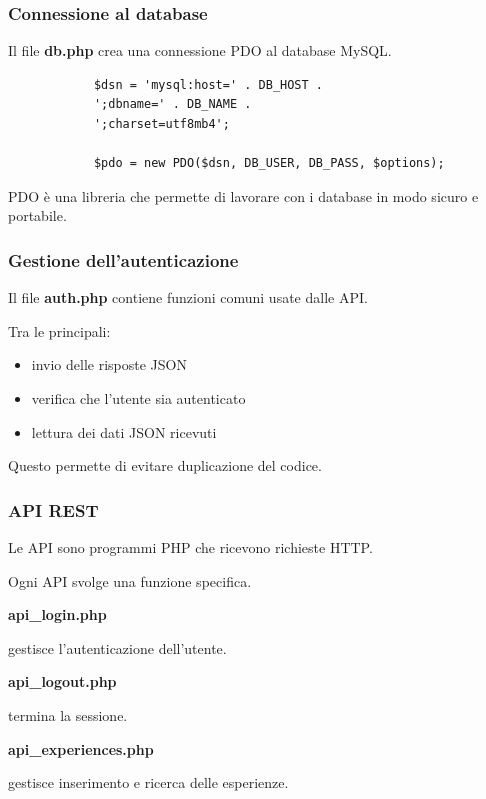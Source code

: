 \documentclass{beamer}
\begin{document}
	\begin{frame}[fragile]
		\frametitle{Connessione al database}
		
		Il file \textbf{db.php }crea una connessione PDO
		al database MySQL.
		
		\begin{lstlisting}
			$dsn = 'mysql:host=' . DB_HOST .
			';dbname=' . DB_NAME .
			';charset=utf8mb4';
			
			$pdo = new PDO($dsn, DB_USER, DB_PASS, $options);
		\end{lstlisting}
		
		PDO è una libreria che permette di lavorare con i database
		in modo sicuro e portabile.
		
	\end{frame}
	
	
	\begin{frame}
		\frametitle{Gestione dell'autenticazione}
		
		Il file \textbf{auth.php }contiene funzioni comuni
		usate dalle API.
		
		Tra le principali:
		
		\begin{itemize}
			\item invio delle risposte JSON
			\item verifica che l'utente sia autenticato
			\item lettura dei dati JSON ricevuti
		\end{itemize}
		
		Questo permette di evitare duplicazione del codice.
		
	\end{frame}
	
	
	\begin{frame}
		\frametitle{API REST}
		
		Le API sono programmi PHP che ricevono richieste HTTP.
		
		Ogni API svolge una funzione specifica.
		
		\bigskip
		
		\textbf{api\_login.php}
		
		gestisce l'autenticazione dell'utente.
		
		\bigskip
		
		\textbf{api\_logout.php}
		
		termina la sessione.
		
		\bigskip
		
		\textbf{api\_experiences.php}
		
		gestisce inserimento e ricerca delle esperienze.
		
	\end{frame}
	
\end{document}
